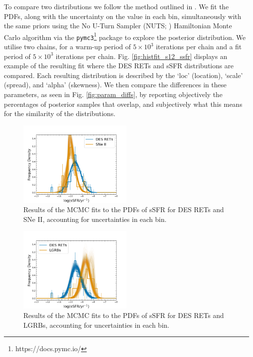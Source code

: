 \documentclass[fleqn,usenatbib,]{mnras}
\begin{document}
To compare two distributions we follow the method outlined in . We fit the PDFs, along with the uncertainty on the value in each bin, simultaneously with the same priors using the No U-Turn Sampler (NUTS; \citealt{Hoffman2014}) Hamiltonian Monte Carlo algorithm via the  \texttt{pymc3}\footnote{https://docs.pymc.io/} package to explore the posterior distribution. We utilise two chains, for a warm-up period of $5\times10^3$ iterations per chain and a fit period of $5\times10^3$ iterations per chain. Fig. \ref{fig:histfit_s12_ssfr} displays an example of the resulting fit where the DES RETs and \citet{Sanders2012} sSFR distributions are compared. Each resulting distribution is described by the `loc' (location), `scale' (spread), and `alpha' (skewness). We then compare the differences in these parameters, as seen in Fig. \ref{fig:param_diffs}, by reporting objectively the percentages of posterior samples that overlap, and subjectively what this means for the similarity of the distributions.
\twocolumn
\begin{figure}
\includegraphics[width=0.5\textwidth]{mc_figs/rets_s13_histfit_ssfr_final.png}
\caption{Results of the MCMC fits to the PDFs of sSFR for DES RETs and SNe II, accounting for uncertainties in each bin.
\label{fig:histfit_ssfr_s13}}
\end{figure}
\begin{figure}
\includegraphics[width=0.5\textwidth]{mc_figs/rets_k15_histfit_ssfr_final.png}
\caption{Results of the MCMC fits to the PDFs of sSFR for DES RETs and LGRBs, accounting for uncertainties in each bin.
\label{fig:histfit_ssfr_k15}}
\end{figure}
\end{document}
